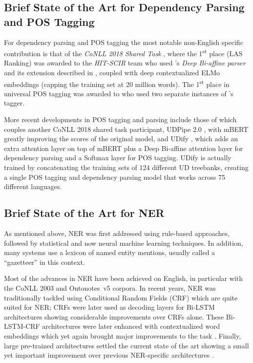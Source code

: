 \subsection{Brief State of the Art for Dependency Parsing and POS Tagging}

For dependency parsing and POS tagging the most notable non-English specific contribution is that of the \emph{CoNLL 2018 Shared Task} \citep{zeman-etal-2018-conll}, where the 1\textsuperscript{st} place (LAS Ranking) was awarded to the \emph{HIT-SCIR} team \citep{che-etal-2018-towards} who used \citet{dozat-manning-2017-deep}'s \emph{Deep Bi-affine parser} and its extension described in \citep{dozat-etal-2017-stanfords}, coupled with deep contextualized ELMo embeddings \citep{peters-etal-2018-deep} (capping the training set at 20 million words). The 1\textsuperscript{st} place in universal POS tagging was awarded to \citet{smith-etal-2018-82} who used two separate instances of \citet{bohnet-etal-2018-morphosyntactic}'s tagger.

More recent developments in POS tagging and parsing include those of \citet{straka-strakova-2019-evaluating} which couples another CoNLL 2018 shared task participant, UDPipe 2.0 \citep{straka-2018-udpipe}, with mBERT greatly improving the scores of the original model, and UDify \citep{kondratyuk-straka-2019-75}, which adds an extra attention layer on top of mBERT plus a Deep Bi-affine attention layer for dependency parsing and a Softmax layer for POS tagging. UDify is actually trained by concatenating the training sets of 124 different UD treebanks, creating a single POS tagging and dependency parsing model that works across 75 different languages.

\subsection{Brief State of the Art for NER}
\label{subsec:sota}

As mentioned above, NER was first addressed using rule-based approaches, followed by statistical and now neural machine learning techniques. In addition, many systems use a lexicon of named entity mentions, usually called a ``gazetteer'' in this context.

Most of the advances in NER  have been achieved on English, in particular with the CoNLL 2003 \citep{tjong-kim-sang-de-meulder-2003-introduction} and  Ontonotes~v5 \citep{pradhan-etal-2012-conll,pradhan-etal-2013-towards} corpora. In recent years, NER was traditionally tackled using Conditional Random Fields (CRF) \citep{lafferty-etal-2001-conditional} which are quite suited for NER; CRFs were later used as decoding layers for Bi-LSTM architectures \citep{huang-etal-2015-bidirectional,lample-etal-2016-neural} showing considerable improvements over CRFs alone. These Bi-LSTM-CRF architectures were later enhanced with contextualized word embeddings which yet again brought major improvements to the task \citep{peters-etal-2018-deep,akbik-etal-2018-contextual}. Finally, large pre-trained architectures settled the current state of the art showing a small yet important improvement over previous NER-specific architectures \citep{devlin-etal-2019-bert,baevski-etal-2019-cloze}.

